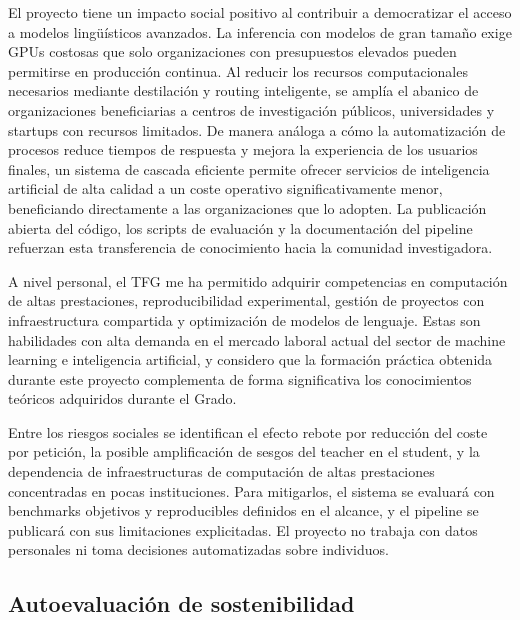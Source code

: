 El proyecto tiene un impacto social positivo al contribuir a democratizar el acceso a modelos lingüísticos avanzados. La inferencia con modelos de gran tamaño exige GPUs costosas que solo organizaciones con presupuestos elevados pueden permitirse en producción continua. Al reducir los recursos computacionales necesarios mediante destilación y routing inteligente, se amplía el abanico de organizaciones beneficiarias a centros de investigación públicos, universidades y startups con recursos limitados. De manera análoga a cómo la automatización de procesos reduce tiempos de respuesta y mejora la experiencia de los usuarios finales, un sistema de cascada eficiente permite ofrecer servicios de inteligencia artificial de alta calidad a un coste operativo significativamente menor, beneficiando directamente a las organizaciones que lo adopten. La publicación abierta del código, los scripts de evaluación y la documentación del pipeline refuerzan esta transferencia de conocimiento hacia la comunidad investigadora.

A nivel personal, el TFG me ha permitido adquirir competencias en computación de altas prestaciones, reproducibilidad experimental, gestión de proyectos con infraestructura compartida y optimización de modelos de lenguaje. Estas son habilidades con alta demanda en el mercado laboral actual del sector de machine learning e inteligencia artificial, y considero que la formación práctica obtenida durante este proyecto complementa de forma significativa los conocimientos teóricos adquiridos durante el Grado.

Entre los riesgos sociales se identifican el efecto rebote por reducción del coste por petición, la posible amplificación de sesgos del teacher en el student, y la dependencia de infraestructuras de computación de altas prestaciones concentradas en pocas instituciones. Para mitigarlos, el sistema se evaluará con benchmarks objetivos y reproducibles definidos en el alcance, y el pipeline se publicará con sus limitaciones explicitadas. El proyecto no trabaja con datos personales ni toma decisiones automatizadas sobre individuos.

\subsection{Autoevaluación de sostenibilidad}

